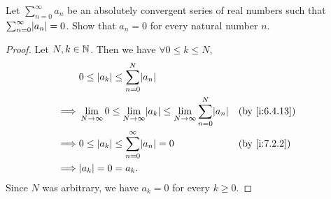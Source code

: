 \begin{ex}\label{i:ex:7.3.3}
  Let \(\sum_{n = 0}^\infty a_n\) be an absolutely convergent series of real numbers such that \(\sum_{n = 0}^\infty \abs{a_n} = 0\).
  Show that \(a_n = 0\) for every natural number \(n\).
\end{ex}

\begin{proof}
  Let \(N, k \in \mathbb{N}\).
  Then we have \(\forall 0 \leq k \leq N\),
  \begin{align*}
             & 0 \leq \abs{a_k} \leq \sum_{n = 0}^N \abs{a_n}                                                                                \\
    \implies & \lim_{N \to \infty} 0 \leq \lim_{N \to \infty} \abs{a_k} \leq \lim_{N \to \infty} \sum_{n = 0}^N \abs{a_n} &  & \by{i:6.4.13} \\
    \implies & 0 \leq \abs{a_k} \leq \sum_{n = 0}^\infty \abs{a_n} = 0                                                    &  & \by{i:7.2.2}  \\
    \implies & \abs{a_k} = 0 = a_k.
  \end{align*}
  Since \(N\) was arbitrary, we have \(a_k = 0\) for every \(k \geq 0\).
\end{proof}

